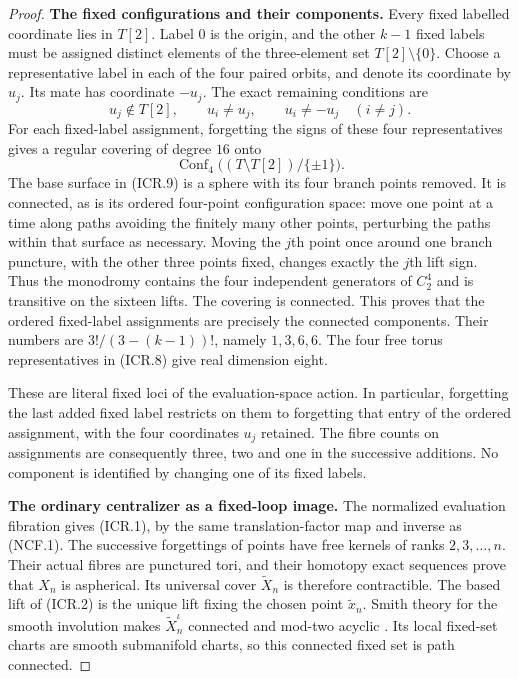 \begin{proof}
\par\medskip\noindent\textbf{The fixed configurations and their components.}\quad
Every fixed labelled coordinate lies in $T[2]$.  Label $0$ is the
origin, and the other $k-1$ fixed labels must be assigned distinct
elements of the three-element set $T[2]\setminus\{0\}$.  Choose a
representative label in each of the four paired orbits, and denote
its coordinate by $u_j$.  Its mate has coordinate $-u_j$.
The exact remaining conditions are
\[
 u_j\notin T[2],\qquad u_i\ne u_j,\qquad u_i\ne-u_j
                                            \quad(i\ne j).
                                                               \tag{ICR.8}
\]
For each fixed-label assignment, forgetting the signs of these four
representatives gives a regular covering of degree $16$ onto
\[
       \operatorname{Conf}_4\bigl((T\setminus T[2])/\{\pm1\}\bigr).
                                                               \tag{ICR.9}
\]
The base surface in (ICR.9) is a sphere with its four branch points
removed.  It is connected, as is its ordered four-point configuration
space: move one point at a time along paths avoiding the finitely many
other points, perturbing the paths within that surface as necessary.
Moving the $j$th point once around one branch puncture, with the other
three points fixed, changes exactly the $j$th lift sign.  Thus the
monodromy contains the four independent generators of $C_2^4$ and
is transitive on the sixteen lifts.  The covering is connected.
This proves that the ordered fixed-label assignments are precisely
the connected components.  Their numbers are
$3!/(3-(k-1))!$, namely $1,3,6,6$.  The four free torus
representatives in (ICR.8) give real dimension eight.

These are literal fixed loci of the evaluation-space action.
In particular, forgetting the last added fixed label restricts on
them to forgetting that entry of the ordered assignment, with the
four coordinates $u_j$ retained.  The fibre counts on assignments
are consequently three, two and one in the successive additions.
No component is identified by changing one of its fixed labels.

\par\medskip\noindent\textbf{The ordinary centralizer as a fixed-loop image.}\quad
The normalized evaluation fibration gives (ICR.1), by the same
translation-factor map and inverse as (NCF.1).  The successive
forgettings of points have free kernels of ranks $2,3,\ldots,n$.
Their actual fibres are punctured tori, and their homotopy exact
sequences prove that $X_n$ is aspherical.  Its universal cover
$\widetilde X_n$ is therefore contractible.  The based lift of
(ICR.2) is the unique lift fixing the chosen point $\widetilde x_n$.
Smith theory for the smooth involution makes
$\widetilde X_n^{\iota}$ connected and mod-two acyclic
\cite[Theorem~3.3.1 and Proposition~3.3.2, p.~274]{ET_Edmonds2012}.
Its local fixed-set charts are smooth submanifold charts, so this
connected fixed set is path connected.


\end{proof}
